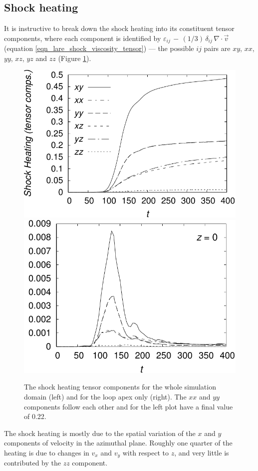 \documentclass{./packages/rs/rsproca}
\begin{document}
\subsection{Shock heating}
\label{sec_NumericalResults_ShockHeating}
It is instructive to break down the shock heating into its constituent tensor components, where each component is identified by $\varepsilon_{ij}\,-\,(1/3)\,\delta_{ij}\,\nabla\cdot\vec{v}\,$ (equation \ref{eqn_lare_shock_viscosity_tensor}) --- the possible $ij$ pairs are $xy$, $xx$, $yy$, $xz$, $yz$ and $zz$ (Figure \ref{ht_visc_comp}).
\begin{figure}[h!]
  \center  
  \includegraphics[scale=0.55]{./gnuplot/256x256x512/ht_visc_comp}
  \includegraphics[scale=0.55]{./gnuplot/256x256x512/ht_visc_comp_apex}
  \caption{\small{The shock heating tensor components for the whole simulation domain (left) and for the loop apex only (right). The $xx$ and $yy$ components follow each other and for the left plot have a final value of 0.22.}}
  \label{ht_visc_comp}
  \vspace{-10pt}
\end{figure}
 The shock heating is mostly due to the spatial variation of the $x$ and $y$ components of velocity in the azimuthal plane. Roughly one quarter of the heating is due to changes in $v_x$ and $v_y$ with respect to $z$, and very little is contributed by the $zz$ component. 
\end{document}
